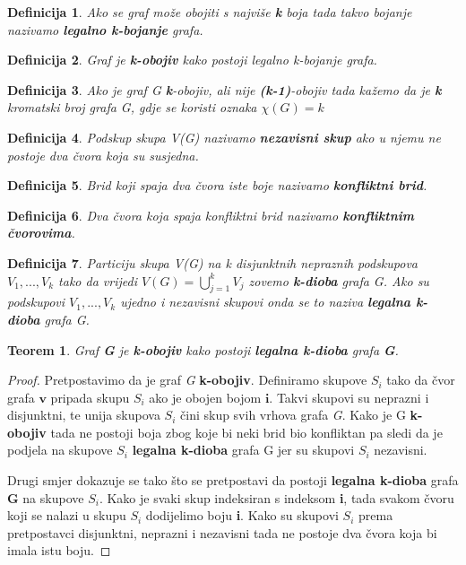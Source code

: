 \documentclass[times, utf8, diplomski, numeric]{fer}
\newtheorem{definition}{Definicija}
\newtheorem{theorem}{Teorem}
\begin{document}
\begin{definition}
Ako se graf može obojiti s najviše \textbf{k} boja tada takvo bojanje nazivamo \textbf{legalno k-bojanje} grafa. 
\end{definition}

\begin{definition}
Graf je \textbf{k-obojiv} kako postoji legalno k-bojanje grafa.
\end{definition}


\begin{definition}
Ako je graf G \textbf{k}-obojiv, ali nije \textbf{(k-1)}-obojiv tada kažemo da je \textbf{k} kromatski broj grafa G, gdje se koristi oznaka $\chi(G)=k$  
\end{definition}


\begin{definition}
Podskup skupa V(G) nazivamo \textbf{nezavisni skup} ako u njemu ne postoje dva čvora koja su susjedna.  
\end{definition}

\begin{definition}
Brid koji spaja dva čvora iste boje nazivamo \textbf{konfliktni brid}.
\end{definition}

\begin{definition}
Dva čvora koja spaja konfliktni brid nazivamo \textbf{konfliktnim čvorovima}.
\end{definition}

\begin{definition}
Particiju skupa V(G) na k disjunktnih nepraznih podskupova $V_1,..., V_k$
 tako da vrijedi $V(G) = \bigcup_{j=1}^{k}V_j$ zovemo \textbf{k-dioba} grafa G. Ako su podskupovi  $V_1 ,..., V_k$  ujedno i nezavisni skupovi onda se to naziva \textbf{legalna k-dioba} grafa G.
\end{definition}

\begin{theorem}
\label{thm:dioba}
Graf \textbf{G} je \textbf{k-obojiv} kako postoji \textbf{legalna k-dioba} grafa \textbf{G}.
\end{theorem}

\begin{proof}
Pretpostavimo da je graf \emph{G} \textbf{k-obojiv}. Definiramo skupove $S_i$ tako da čvor grafa $\mathbf{v}$ pripada skupu $S_i$ ako je obojen bojom $\mathbf{i}$. Takvi skupovi su neprazni i disjunktni, te unija skupova $S_i$ čini skup svih vrhova grafa \emph{G}. Kako je G \textbf{k-obojiv} tada ne postoji boja zbog koje bi neki brid bio konfliktan pa sledi da je podjela na skupove $S_i$ \textbf{legalna k-dioba} grafa G jer su skupovi $S_i$ nezavisni. 

Drugi smjer dokazuje se tako što se pretpostavi da postoji \textbf{legalna k-dioba} grafa \textbf{G} na skupove $S_i$. Kako je svaki skup indeksiran s indeksom \textbf{i}, tada svakom čvoru koji se nalazi u skupu $S_i$ dodijelimo boju \textbf{i}. Kako su skupovi $S_i$ prema pretpostavci disjunktni, neprazni i nezavisni tada ne postoje dva čvora koja bi imala istu boju.
\end{proof}
\end{document}

